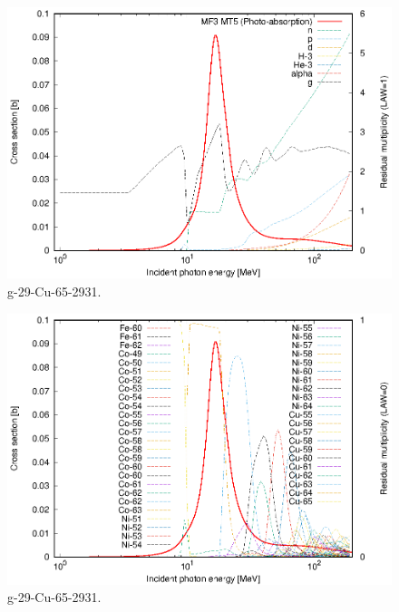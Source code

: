 \begin{figure}
 \includegraphics[width=\linewidth]{eps/g_29-Cu-65_2931.eps}
  \caption{g-29-Cu-65-2931.}
\end{figure}
\begin{figure}
 \includegraphics[width=\linewidth]{eps-law0/g_29-Cu-65_2931.eps}
 \caption{g-29-Cu-65-2931.}
\end{figure}
\newpage \clearpage

